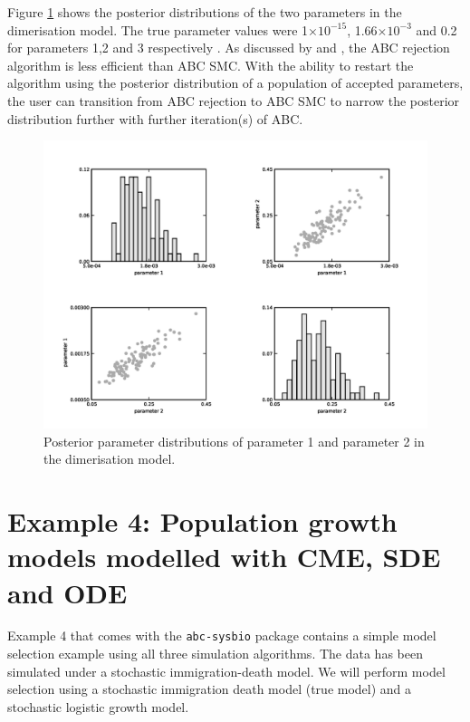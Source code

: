 \documentclass[a4paper]{report}
\begin{document}
Figure \ref{DimerisationResults} shows the posterior distributions of the two parameters in the dimerisation model. The true parameter values were 1$\times 10^{-15}$, 1.66$\times 10^{-3}$ and 0.2 for parameters 1,2 and 3 respectively . As discussed by \citep{Toni2009} and \citep{Sisson2007}, the ABC rejection algorithm is less efficient than ABC SMC. With the ability to restart the algorithm using the posterior distribution of a population of accepted parameters, the user can transition from ABC rejection to ABC SMC to narrow the posterior distribution further with further iteration(s) of ABC.
\begin{figure}[htbp]
\begin{center}
\includegraphics[width=1.0\textwidth]{Graphics/DimerisationResults.png}
\caption{Posterior parameter distributions of parameter 1 and parameter 2 in the dimerisation model. \label{DimerisationResults}}
\end{center}
\end{figure}

\section{Example 4: Population growth models modelled with CME, SDE and ODE}
Example 4 that comes with the \verb$abc-sysbio$ package contains a simple model selection example using all three simulation algorithms. The data has been simulated under a stochastic immigration-death model. We will perform model selection using a stochastic immigration death model (true model) and a stochastic logistic growth model. 
\end{document}
